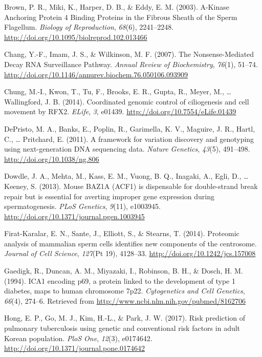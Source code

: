 \documentclass[12pt,twoside]{reedthesis}
\theoremstyle{definition}
\theoremstyle{definition}
\theoremstyle{remark}
\begin{document}
  \hypertarget{ref-Brown2003}{}
  Brown, P. R., Miki, K., Harper, D. B., \& Eddy, E. M. (2003). A-Kinase
  Anchoring Protein 4 Binding Proteins in the Fibrous Sheath of the Sperm
  Flagellum. \emph{Biology of Reproduction}, \emph{68}(6), 2241--2248.
  \url{http://doi.org/10.1095/biolreprod.102.013466}
  
  \hypertarget{ref-Chang2007}{}
  Chang, Y.-F., Imam, J. S., \& Wilkinson, M. F. (2007). The
  Nonsense-Mediated Decay RNA Surveillance Pathway. \emph{Annual Review of
  Biochemistry}, \emph{76}(1), 51--74.
  \url{http://doi.org/10.1146/annurev.biochem.76.050106.093909}
  
  \hypertarget{ref-Chung2014}{}
  Chung, M.-I., Kwon, T., Tu, F., Brooks, E. R., Gupta, R., Meyer, M.,
  \ldots{} Wallingford, J. B. (2014). Coordinated genomic control of
  ciliogenesis and cell movement by RFX2. \emph{ELife}, \emph{3}, e01439.
  \url{http://doi.org/10.7554/eLife.01439}
  
  \hypertarget{ref-DePristo2011}{}
  DePristo, M. A., Banks, E., Poplin, R., Garimella, K. V., Maguire, J.
  R., Hartl, C., \ldots{} Pritchard, E. (2011). A framework for variation
  discovery and genotyping using next-generation DNA sequencing data.
  \emph{Nature Genetics}, \emph{43}(5), 491--498.
  \url{http://doi.org/10.1038/ng.806}
  
  \hypertarget{ref-Dowdle2013}{}
  Dowdle, J. A., Mehta, M., Kass, E. M., Vuong, B. Q., Inagaki, A., Egli,
  D., \ldots{} Keeney, S. (2013). Mouse BAZ1A (ACF1) is dispensable for
  double-strand break repair but is essential for averting improper gene
  expression during spermatogenesis. \emph{PLoS Genetics}, \emph{9}(11),
  e1003945. \url{http://doi.org/10.1371/journal.pgen.1003945}
  
  \hypertarget{ref-Firat-Karalar2014}{}
  Firat-Karalar, E. N., Sante, J., Elliott, S., \& Stearns, T. (2014).
  Proteomic analysis of mammalian sperm cells identifies new components of
  the centrosome. \emph{Journal of Cell Science}, \emph{127}(Pt 19),
  4128--33. \url{http://doi.org/10.1242/jcs.157008}
  
  \hypertarget{ref-Gaedigk1994}{}
  Gaedigk, R., Duncan, A. M., Miyazaki, I., Robinson, B. H., \& Dosch, H.
  M. (1994). ICA1 encoding p69, a protein linked to the development of
  type 1 diabetes, maps to human chromosome 7p22. \emph{Cytogenetics and
  Cell Genetics}, \emph{66}(4), 274--6. Retrieved from
  \url{http://www.ncbi.nlm.nih.gov/pubmed/8162706}
  
  \hypertarget{ref-Hong2017}{}
  Hong, E. P., Go, M. J., Kim, H.-L., \& Park, J. W. (2017). Risk
  prediction of pulmonary tuberculosis using genetic and conventional risk
  factors in adult Korean population. \emph{PloS One}, \emph{12}(3),
  e0174642. \url{http://doi.org/10.1371/journal.pone.0174642}
  
\end{document}
